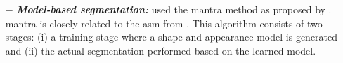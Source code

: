 \begin{enumerate}[leftmargin=*]
%

\item[$-$] \textbf{\textit{Model-based segmentation:}} \cite{Viswanath2008a,Viswanath2009} used the \ac{mantra} method as proposed by \cite{Toth2008}. \ac{mantra} is closely related to the \ac{asm} from \cite{Cootes1995}. This algorithm consists of two stages: (i) a training stage where a shape and appearance model is generated and (ii) the actual segmentation performed based on the learned model. 


\end{enumerate}
